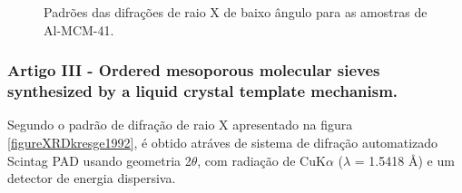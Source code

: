 \begin{figure}[ht]
    \center
    \begin{minipage}{10cm}
     \caption{Padrões das difrações de raio X de baixo ângulo para as amostras de Al-MCM-41.}\label{figureDifratogramBedoya2021} 
     \end{minipage}
\end{figure}

\subsubsection*{\textbf{Artigo III} - Ordered mesoporous molecular sieves synthesized
by a liquid crystal template mechanism.}

Segundo  o padrão de difração de raio X apresentado na figura \ref{figureXRDkresge1992},
é obtido atráves de sistema de difração automatizado Scintag PAD usando geometria 2$\theta$, com
radiação de CuK$\alpha$ ($\lambda$ = 1.5418 \AA) e um detector de energia dispersiva.

